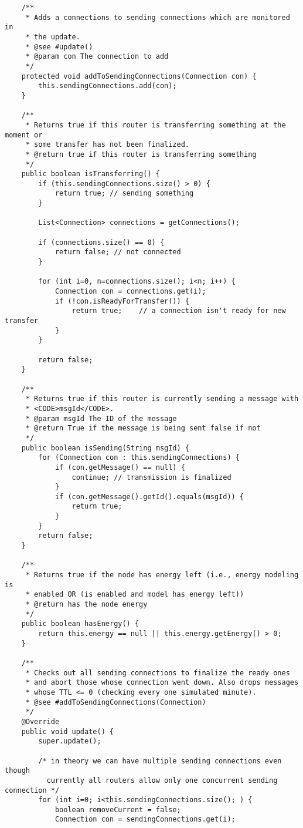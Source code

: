 \documentclass[11pt]{icsthesis}
\begin{document}
\begin{framed}
\begin{verbatim}
	/**
	 * Adds a connections to sending connections which are monitored in
	 * the update.
	 * @see #update()
	 * @param con The connection to add
	 */
	protected void addToSendingConnections(Connection con) {
		this.sendingConnections.add(con);
	}
		
	/**
	 * Returns true if this router is transferring something at the moment or
	 * some transfer has not been finalized.
	 * @return true if this router is transferring something
	 */
	public boolean isTransferring() {
		if (this.sendingConnections.size() > 0) {
			return true; // sending something
		}
		
		List<Connection> connections = getConnections();
		
		if (connections.size() == 0) {
			return false; // not connected
		}
		
		for (int i=0, n=connections.size(); i<n; i++) {
			Connection con = connections.get(i);
			if (!con.isReadyForTransfer()) {
				return true;	// a connection isn't ready for new transfer
			}
		}
		
		return false;		
	}
	
	/**
	 * Returns true if this router is currently sending a message with 
	 * <CODE>msgId</CODE>.
	 * @param msgId The ID of the message
	 * @return True if the message is being sent false if not
	 */
	public boolean isSending(String msgId) {
		for (Connection con : this.sendingConnections) {
			if (con.getMessage() == null) {
				continue; // transmission is finalized
			}
			if (con.getMessage().getId().equals(msgId)) {
				return true;
			}
		}
		return false;
	}
	
	/**
	 * Returns true if the node has energy left (i.e., energy modeling is
	 * enabled OR (is enabled and model has energy left))
	 * @return has the node energy
	 */
	public boolean hasEnergy() {
		return this.energy == null || this.energy.getEnergy() > 0;
	}
	
	/**
	 * Checks out all sending connections to finalize the ready ones 
	 * and abort those whose connection went down. Also drops messages
	 * whose TTL <= 0 (checking every one simulated minute).
	 * @see #addToSendingConnections(Connection)
	 */
	@Override
	public void update() {		
		super.update();
		
		/* in theory we can have multiple sending connections even though
		  currently all routers allow only one concurrent sending connection */
		for (int i=0; i<this.sendingConnections.size(); ) {
			boolean removeCurrent = false;
			Connection con = sendingConnections.get(i);
			

\end{verbatim}
\end{framed}
\end{document}

